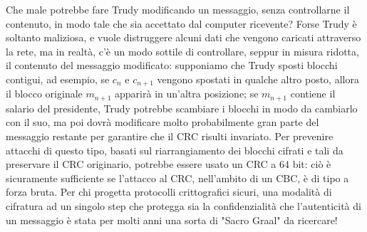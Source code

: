 Che male potrebbe fare Trudy modificando un messaggio, senza controllarne il contenuto, in modo
tale che sia accettato dal computer ricevente? Forse Trudy è soltanto maliziosa, e vuole distruggere
alcuni dati che vengono caricati attraverso la rete, ma in realtà, c'è un modo sottile di controllare, seppur in misura ridotta, il contenuto del messaggio modificato: supponiamo che Trudy sposti blocchi contigui, ad esempio, se $c_{n}$ e $c_{n+1}$ vengono spostati in qualche altro posto, allora il blocco originale $m_{n+1}$ apparirà in un'altra posizione; se $m_{n+1}$ contiene il salario del presidente, Trudy
potrebbe scambiare i blocchi in modo da cambiarlo con il suo, ma poi dovrà modificare molto probabilmente gran parte del messaggio restante per garantire che il CRC risulti invariato.\newline \newline
Per prevenire attacchi di questo tipo, basati sul riarrangiamento dei blocchi cifrati e tali da preservare il CRC originario, potrebbe essere usato un CRC a 64 bit: ciò è sicuramente sufficiente se l'attacco al CRC, nell'ambito di un CBC, è di tipo a forza bruta. \newline
Per chi progetta protocolli crittografici sicuri, una modalità di cifratura ad un singolo step che protegga sia la confidenzialità che l'autenticità di un messaggio è stata per molti anni una sorta di "Sacro Graal" da ricercare!

